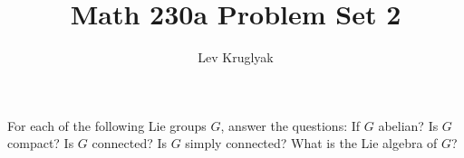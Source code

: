 \documentclass{../../templates/lkx_pset}
\title{Math 230a Problem Set 2}
\author{Lev Kruglyak}
\begin{document}
\maketitle

%
%
%

\begin{problem}{4}
	For each of the following Lie groups $G$, answer the questions: If $G$ abelian? Is $G$ compact? Is $G$ connected? Is $G$ simply connected? What is the Lie algebra of $G$?
\end{problem}
\end{document}
